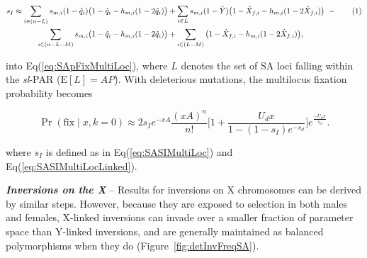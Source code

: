 \documentclass{article}
\newcommand\numberthis{\addtocounter{equation}{1}\tag{\theequation}}
\begin{document}
\begin{align*}\label{eq:SASIMultiLocLinked}
		s_I \approx \sum_{i \in (n - L)} s_{m,i} (1 - \hat{q}_{i}) \big( 1 - \hat{q}_i - h_{m,i} (1 - 2 \hat{q}_i) \big) &+ \sum_{i \in L} s_{m,i}(1 - \hat{Y}) \big( 1 - \hat{X}_{f,i} - h_{m,i}(1 - 2 \hat{X}_{f,i}) \big)~- \numberthis\\
		\sum_{i \in (n-L-M)} s_{m,i} \big( 1 - \hat{q}_i - h_{m,i} (1 - 2 \hat{q}_i) \big) &+ \sum_{i \in (L-M)} \big( 1 - \hat{X}_{f,i} - h_{m,i}(1 - 2 \hat{X}_{f,i}) \big),
\end{align*}

\noindent into Eq(\ref{eq:SApFixMultiLoc}), where $L$ denotes the set of SA loci falling within the {\itshape sl}-PAR ($\text{E} [L] = AP$). With deleterious mutations, the multilocus fixation probability becomes

\begin{equation} \label{eq:SApFixMultiLocDelMut}
	\Pr(\text{fix} \mid x, k = 0) \approx 2 s_I e^{-xA} \frac{(xA)^n}{n!} \Bigg[ 1+ \frac{U_d x}{1 - (1-s_I)e^{-s_d}} \Bigg] e^{\frac{-					U_d x}{s_d}}.
\end{equation}

\noindent where $s_I$ is defined as in Eq(\ref{eq:SASIMultiLoc}) and Eq(\ref{eq:SASIMultiLocLinked}).
\vspace{12pt}

\vspace{12pt}

{\bf \itshape Inversions on the X} -- Results for inversions on X chromosomes can be derived by similar steps. However, because they are exposed to selection in both males and females, X-linked inversions can invade over a smaller fraction of parameter space than Y-linked inversions, and are generally maintained as balanced polymorphisms when they do (Figure~\ref{fig:detInvFreqSA}). 
\vspace{12pt}

\end{document}
